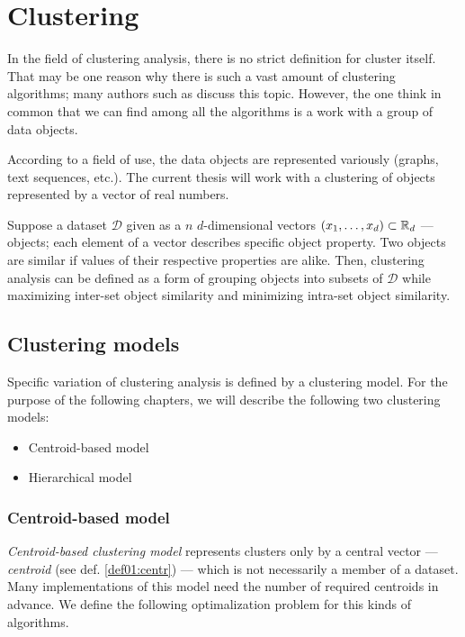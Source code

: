 \chapter{Clustering}

In the field of clustering analysis, there is no strict definition for cluster itself. That may be one reason why there is such a vast amount of clustering algorithms; many authors such as \citet{estivill2002so} discuss this topic.  However, the one think in common that we can find among all the algorithms is a work with a group of data objects.


According to a field of use, the data objects are represented variously (graphs, text sequences, etc.). The current thesis will work with a clustering of objects represented by a vector of real numbers.

Suppose a dataset $\mathcal{D}$ given as a $n$ $d$-dimensional vectors $(x_1,\dots,x_d) \subset \mathbb{R}_d$  --- objects; each element of a vector describes specific object property. Two objects are similar if values of their respective properties are alike. Then, clustering analysis can be defined as a form of grouping objects into subsets of $\mathcal{D}$ while maximizing inter-set object similarity and minimizing intra-set object similarity.

\section{Clustering models}

Specific variation of clustering analysis is defined by a clustering model. For the purpose of the following chapters, we will describe the following two clustering models:
\begin{itemize}
	\item Centroid-based model
	\item Hierarchical model
\end{itemize}


\subsection{Centroid-based model}

\emph{Centroid-based clustering model} represents clusters only by a central vector --- \emph{centroid} (see def. \ref{def01:centr}) --- which is not necessarily a member of a dataset. Many implementations of this model need the number of required centroids in advance. We define the following optimalization problem for this kinds of algorithms. 

